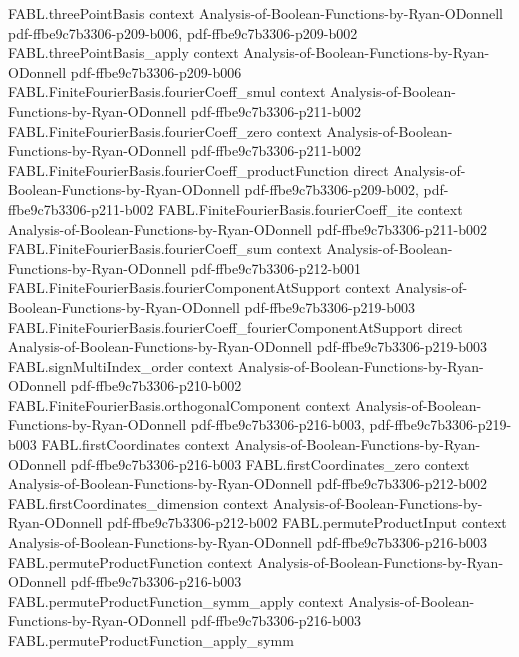 \begin{theorem}
\proofstep
  {FABL.threePointBasis}
  {context}
  {Analysis-of-Boolean-Functions-by-Ryan-ODonnell}
  {pdf-ffbe9c7b3306-p209-b006,
    pdf-ffbe9c7b3306-p209-b002}
\proofstep
  {FABL.threePointBasis_apply}
  {context}
  {Analysis-of-Boolean-Functions-by-Ryan-ODonnell}
  {pdf-ffbe9c7b3306-p209-b006}
\proofstep
  {FABL.FiniteFourierBasis.fourierCoeff_smul}
  {context}
  {Analysis-of-Boolean-Functions-by-Ryan-ODonnell}
  {pdf-ffbe9c7b3306-p211-b002}
\proofstep
  {FABL.FiniteFourierBasis.fourierCoeff_zero}
  {context}
  {Analysis-of-Boolean-Functions-by-Ryan-ODonnell}
  {pdf-ffbe9c7b3306-p211-b002}
\proofstep
  {FABL.FiniteFourierBasis.fourierCoeff_productFunction}
  {direct}
  {Analysis-of-Boolean-Functions-by-Ryan-ODonnell}
  {pdf-ffbe9c7b3306-p209-b002,
    pdf-ffbe9c7b3306-p211-b002}
\proofstep
  {FABL.FiniteFourierBasis.fourierCoeff_ite}
  {context}
  {Analysis-of-Boolean-Functions-by-Ryan-ODonnell}
  {pdf-ffbe9c7b3306-p211-b002}
\proofstep
  {FABL.FiniteFourierBasis.fourierCoeff_sum}
  {context}
  {Analysis-of-Boolean-Functions-by-Ryan-ODonnell}
  {pdf-ffbe9c7b3306-p212-b001}
\proofstep
  {FABL.FiniteFourierBasis.fourierComponentAtSupport}
  {context}
  {Analysis-of-Boolean-Functions-by-Ryan-ODonnell}
  {pdf-ffbe9c7b3306-p219-b003}
\proofstep
  {FABL.FiniteFourierBasis.fourierCoeff_fourierComponentAtSupport}
  {direct}
  {Analysis-of-Boolean-Functions-by-Ryan-ODonnell}
  {pdf-ffbe9c7b3306-p219-b003}
\proofstep
  {FABL.signMultiIndex_order}
  {context}
  {Analysis-of-Boolean-Functions-by-Ryan-ODonnell}
  {pdf-ffbe9c7b3306-p210-b002}
\proofstep
  {FABL.FiniteFourierBasis.orthogonalComponent}
  {context}
  {Analysis-of-Boolean-Functions-by-Ryan-ODonnell}
  {pdf-ffbe9c7b3306-p216-b003,
    pdf-ffbe9c7b3306-p219-b003}
\proofstep
  {FABL.firstCoordinates}
  {context}
  {Analysis-of-Boolean-Functions-by-Ryan-ODonnell}
  {pdf-ffbe9c7b3306-p216-b003}
\proofstep
  {FABL.firstCoordinates_zero}
  {context}
  {Analysis-of-Boolean-Functions-by-Ryan-ODonnell}
  {pdf-ffbe9c7b3306-p212-b002}
\proofstep
  {FABL.firstCoordinates_dimension}
  {context}
  {Analysis-of-Boolean-Functions-by-Ryan-ODonnell}
  {pdf-ffbe9c7b3306-p212-b002}
\proofstep
  {FABL.permuteProductInput}
  {context}
  {Analysis-of-Boolean-Functions-by-Ryan-ODonnell}
  {pdf-ffbe9c7b3306-p216-b003}
\proofstep
  {FABL.permuteProductFunction}
  {context}
  {Analysis-of-Boolean-Functions-by-Ryan-ODonnell}
  {pdf-ffbe9c7b3306-p216-b003}
\proofstep
  {FABL.permuteProductFunction_symm_apply}
  {context}
  {Analysis-of-Boolean-Functions-by-Ryan-ODonnell}
  {pdf-ffbe9c7b3306-p216-b003}
\proofstep
  {FABL.permuteProductFunction_apply_symm}

\end{theorem}
